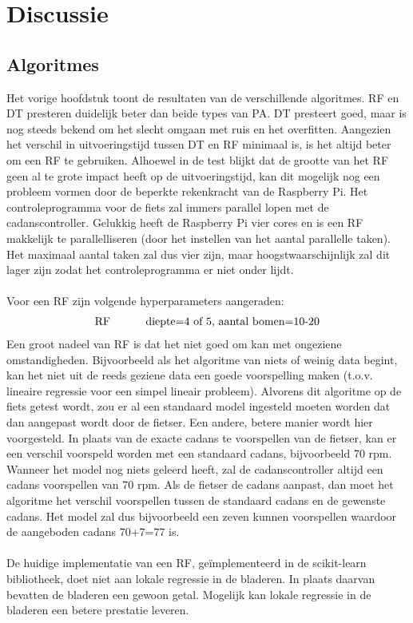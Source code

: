 \chapter{Discussie}
\section{Algoritmes}
Het vorige hoofdstuk toont de resultaten van de verschillende algoritmes. RF en DT presteren duidelijk beter dan beide types van PA. DT presteert goed, maar is nog steeds bekend om het slecht omgaan met ruis en het overfitten. Aangezien het verschil in uitvoeringstijd tussen DT en RF minimaal is, is het altijd beter om een RF te gebruiken. Alhoewel in de test blijkt dat de grootte van het RF geen al te grote impact heeft op de uitvoeringstijd, kan dit mogelijk nog een probleem vormen door de beperkte rekenkracht van de Raspberry Pi. Het controleprogramma voor de fiets zal immers parallel lopen met de cadanscontroller. Gelukkig heeft de Raspberry Pi vier cores en is een RF makkelijk te parallelliseren (door het instellen van het aantal parallelle taken). Het maximaal aantal taken zal dus vier zijn, maar hoogstwaarschijnlijk zal dit lager zijn zodat het controleprogramma er niet onder lijdt.
\\\\
Voor een RF zijn volgende hyperparameters aangeraden:
\begin{gather*}
\text{RF \tab diepte=4 of 5, aantal bomen=10-20}
\end{gather*}
Een groot nadeel van RF is dat het niet goed om kan met ongeziene omstandigheden. Bijvoorbeeld als het algoritme van niets of weinig data begint, kan het niet uit de reeds geziene data een goede voorspelling maken (t.o.v. lineaire regressie voor een simpel lineair probleem). Alvorens dit algoritme op de fiets getest wordt, zou er al een standaard model ingesteld moeten worden dat dan aangepast wordt door de fietser. Een andere, betere manier wordt hier voorgesteld. In plaats van de exacte cadans te voorspellen van de fietser, kan er een verschil voorspeld worden met een standaard cadans, bijvoorbeeld 70 rpm. Wanneer het model nog niets geleerd heeft, zal de cadanscontroller altijd een cadans voorspellen van 70 rpm. Als de fietser de cadans aanpast, dan moet het algoritme het verschil voorspellen tussen de standaard cadans en de gewenste cadans. Het model zal dus bijvoorbeeld een zeven kunnen voorspellen waardoor de aangeboden cadans 70+7=77 is.
\\\\
De huidige implementatie van een RF, geïmplementeerd in de scikit-learn bibliotheek, doet niet aan lokale regressie in de bladeren. In plaats daarvan bevatten de bladeren een gewoon getal. Mogelijk kan lokale regressie in de bladeren een betere prestatie leveren.
